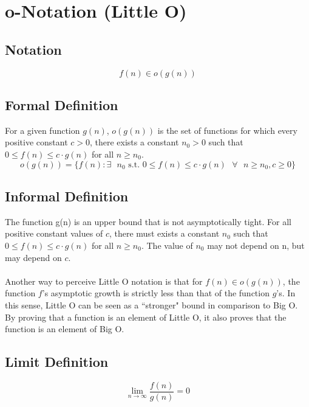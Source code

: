 \section{o-Notation (Little O)}

\subsection*{Notation}
$$
f(n) \in o(g(n))
$$

\subsection*{Formal Definition}
For a given function $g(n)$, $o(g(n))$ is the set  of functions for which every positive constant $c > 0$, there exists a constant $n_0 > 0$ such that $0 \leq f(n) \leq c \cdot g(n)$ for all $n \geq n_0$.
$$
o(g(n)) = \{ f(n) : \exists \text{ } n_0 \text{ s.t. } 0 \leq f(n) \leq c \cdot g(n) \text{ } \forall \text{ } n \geq n_0, c \geq 0 \}
$$

\subsection*{Informal Definition}
The function g(n) is an upper bound that is not asymptotically tight. For all positive constant values of $c$, there must exists a constant $n_0$ such that $0 \leq f(n) \leq c \cdot g(n)$ for all $n \geq n_0$. The value of $n_0$ may not depend on n, but may depend on $c$.\\\\
Another way to perceive Little O notation is that for $f(n) \in o(g(n))$, the function $f$'s asymptotic growth is strictly less than that of the function $g$'s. In this sense, Little O can be seen as a ``stronger" bound in comparison to Big O. By proving that a function is an element of Little O, it also proves that the function is an element of Big O.

\subsection*{Limit Definition}
$$
\lim\limits_{n\to\infty} \frac{f(n)}{g(n)} = 0
$$

